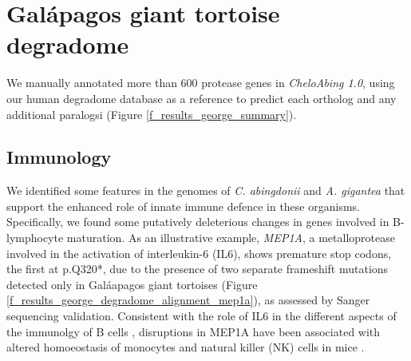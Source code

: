 \section{Gal\'{a}pagos giant tortoise degradome} \label{s_results_george_degradome}

We manually annotated more than 600 protease genes in \emph{CheloAbing 1.0}, using our human degradome database as a reference to predict each ortholog and any additional paralogsi (Figure \ref{f_results_george_summary}).

\subsection{Immunology} \label{ss_results_george_degradome_immunology}


We identified some features in the genomes of \textit{C. abingdonii} and \textit{A. gigantea} that support the enhanced role of innate immune defence in these organisms.
Specifically, we found some putatively deleterious changes in genes involved in B-lymphocyte maturation.
As an illustrative example, \textit{MEP1A}, a metalloprotease involved in the activation of interleukin-6 (IL6), shows premature stop codons, the first at {p.Q320*}, due to the presence of two separate frameshift mutations detected only in Gal\'{a}apagos giant tortoises (Figure \ref{f_results_george_degradome_alignment_mep1a}), as assessed by Sanger sequencing validation.
Consistent with the role of IL6 in the different aspects of the immunolgy of B cells \cite{Eto2011}, disruptions in MEP1A have been associated with altered homoeostasis of monocytes and natural killer (NK) cells in mice \cite{Sun2009}.

